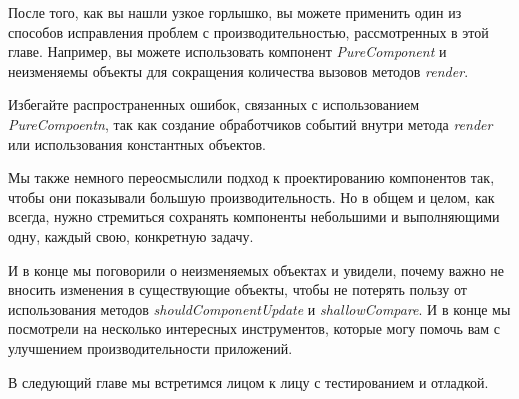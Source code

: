 После того, как вы нашли узкое горлышко, вы можете применить один из способов исправления проблем с производительностью, рассмотренных в этой главе. Например, вы можете использовать компонент \textit{PureComponent} и неизменяемы объекты для сокращения количества вызовов методов \textit{render}.

Избегайте распространенных ошибок, связанных с использованием \textit{PureCompoentn}, так как создание обработчиков событий внутри метода \textit{render} или использования константных объектов.

Мы также немного переосмыслили подход к проектированию компонентов так, чтобы они показывали большую производительность. Но в общем и целом, как всегда, нужно стремиться сохранять компоненты небольшими и выполняющими одну, каждый свою, конкретную задачу.

И в конце мы поговорили о неизменяемых объектах и увидели, почему важно не вносить изменения в существующие объекты, чтобы не потерять пользу от использования методов \textit{shouldComponentUpdate} и \textit{shallowCompare}. И в конце мы посмотрели на несколько интересных инструментов, которые могу помочь вам с улучшением производительности приложений.

В следующий главе мы встретимся лицом к лицу с тестированием и отладкой. 

